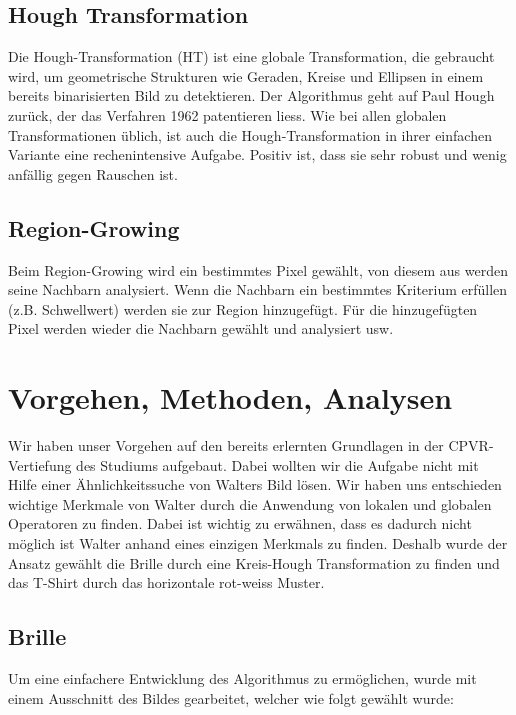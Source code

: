 \documentclass[paper=a4,fontsize=12pt]{scrartcl}
\begin{document}
\subsection*{Hough Transformation}
Die Hough-Transformation (HT) ist eine globale Transformation, die gebraucht wird, um
geometrische Strukturen wie Geraden, Kreise und Ellipsen in einem bereits binarisierten
Bild zu detektieren. Der Algorithmus geht auf Paul Hough zurück, der das Verfahren 1962
patentieren liess.
Wie bei allen globalen Transformationen üblich, ist auch die Hough-Transformation in
ihrer einfachen Variante eine rechenintensive Aufgabe. Positiv ist, dass sie sehr robust
und wenig anfällig gegen Rauschen ist.
\subsection*{Region-Growing}
Beim Region-Growing wird ein bestimmtes Pixel gewählt, von diesem aus werden seine Nachbarn analysiert. Wenn die Nachbarn ein bestimmtes Kriterium erfüllen (z.B. Schwellwert) werden sie zur Region hinzugefügt. Für die hinzugefügten Pixel werden wieder die Nachbarn gewählt und analysiert usw.
\newpage
\section*{Vorgehen, Methoden, Analysen}
Wir haben unser Vorgehen auf den bereits erlernten Grundlagen in der CPVR-Vertiefung des Studiums aufgebaut. Dabei wollten wir die Aufgabe nicht mit Hilfe einer Ähnlichkeitssuche von Walters Bild lösen. Wir haben uns entschieden wichtige Merkmale von Walter durch die Anwendung von lokalen und globalen Operatoren zu finden. Dabei ist wichtig zu erwähnen, dass es dadurch nicht möglich ist Walter anhand eines einzigen Merkmals zu finden. Deshalb wurde der Ansatz gewählt die Brille durch eine Kreis-Hough Transformation zu finden und das T-Shirt durch das horizontale rot-weiss Muster.
\subsection*{Brille}
Um eine einfachere Entwicklung des Algorithmus zu ermöglichen, wurde mit einem Ausschnitt des Bildes gearbeitet, welcher wie folgt gewählt wurde:
\end{document}

